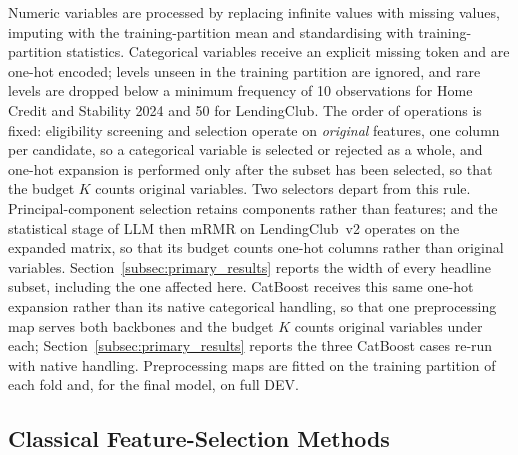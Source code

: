 \documentclass[final,5p,twocolumn]{elsarticle}
\newcommand{\Kfeat}{K}
\begin{document}
Numeric variables are processed by replacing infinite values with missing values, imputing with the training-partition mean and standardising with training-partition statistics. Categorical variables receive an explicit missing token and are one-hot encoded; levels unseen in the training partition are ignored, and rare levels are dropped below a minimum frequency of 10 observations for Home Credit and Stability 2024 and 50 for LendingClub. The order of operations is fixed: eligibility screening and selection operate on \emph{original} features, one column per candidate, so a categorical variable is selected or rejected as a whole, and one-hot expansion is performed only after the subset has been selected, so that the budget $\Kfeat$ counts original variables. Two selectors depart from this rule. Principal-component selection retains components rather than features; and the statistical stage of LLM then mRMR on LendingClub~v2 operates on the expanded matrix, so that its budget counts one-hot columns rather than original variables. Section~\ref{subsec:primary_results} reports the width of every headline subset, including the one affected here. CatBoost receives this same one-hot expansion rather than its native categorical handling, so that one preprocessing map serves both backbones and the budget $\Kfeat$ counts original variables under each; Section~\ref{subsec:primary_results} reports the three CatBoost cases re-run with native handling. Preprocessing maps are fitted on the training partition of each fold and, for the final model, on full DEV.

\subsection{Classical Feature-Selection Methods}
\label{subsec:classical_fs}
\end{document}
